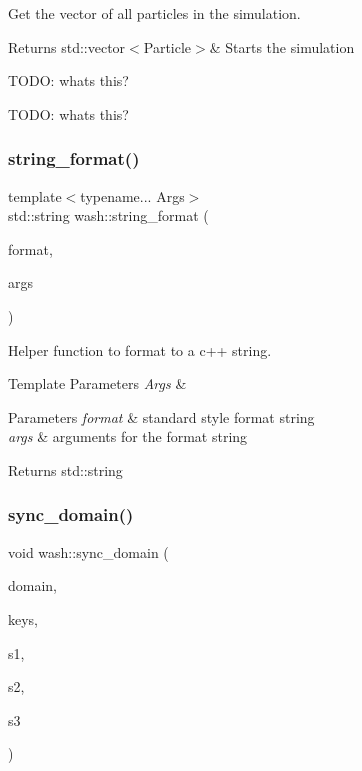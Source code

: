 Get the vector of all particles in the simulation. 

\begin{DoxyReturn}{Returns}
std\+::vector$<$\+Particle$>$\& Starts the simulation 
\end{DoxyReturn}
T\+O\+DO\+: what\textquotesingle{}s this?

T\+O\+DO\+: what\textquotesingle{}s this? \mbox{\label{namespacewash_a3c692ea6f1cb04614c790fd4b9dc34ba}} 
\subsubsection{\texorpdfstring{string\+\_\+format()}{string\_format()}}
{\footnotesize\ttfamily template$<$typename... Args$>$ \\
std\+::string wash\+::string\+\_\+format (\begin{DoxyParamCaption}\item[{const std\+::string \&}]{format,  }\item[{Args...}]{args }\end{DoxyParamCaption})}



Helper function to format to a c++ string. 


\begin{DoxyTemplParams}{Template Parameters}
{\em Args} & \\
\hline
\end{DoxyTemplParams}

\begin{DoxyParams}{Parameters}
{\em format} & standard style format string \\
\hline
{\em args} & arguments for the format string \\
\hline
\end{DoxyParams}
\begin{DoxyReturn}{Returns}
std\+::string 
\end{DoxyReturn}
\mbox{\label{namespacewash_a075ba78df60938a5d76fe39041396f37}} 
\subsubsection{\texorpdfstring{sync\+\_\+domain()}{sync\_domain()}}
{\footnotesize\ttfamily void wash\+::sync\+\_\+domain (\begin{DoxyParamCaption}\item[{cstone\+::\+Domain$<$ uint64\+\_\+t, double, cstone\+::\+Cpu\+Tag $>$ \&}]{domain,  }\item[{std\+::vector$<$ size\+\_\+t $>$ \&}]{keys,  }\item[{std\+::vector$<$ double $>$ \&}]{s1,  }\item[{std\+::vector$<$ double $>$ \&}]{s2,  }\item[{std\+::vector$<$ double $>$ \&}]{s3 }\end{DoxyParamCaption})}

